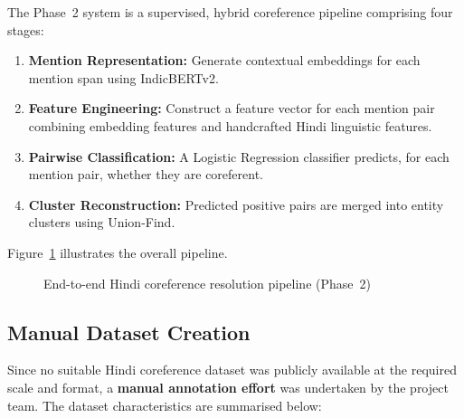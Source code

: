 \documentclass[12pt,a4paper]{report}
\begin{document}
The Phase~2 system is a supervised, hybrid coreference pipeline comprising four stages:

\begin{enumerate}
    \item \textbf{Mention Representation:} Generate contextual embeddings for each mention span using IndicBERTv2.
    \item \textbf{Feature Engineering:} Construct a feature vector for each mention pair combining embedding features and handcrafted Hindi linguistic features.
    \item \textbf{Pairwise Classification:} A Logistic Regression classifier predicts, for each mention pair, whether they are coreferent.
    \item \textbf{Cluster Reconstruction:} Predicted positive pairs are merged into entity clusters using Union-Find.
\end{enumerate}

Figure~\ref{fig:system_arch} illustrates the overall pipeline.

\begin{figure}[H]
\centering
{}
\caption{End-to-end Hindi coreference resolution pipeline (Phase~2)}
\label{fig:system_arch}
\end{figure}

\subsection{Manual Dataset Creation}

Since no suitable Hindi coreference dataset was publicly available at the required scale and format, a \textbf{manual annotation effort} was undertaken by the project team. The dataset characteristics are summarised below:
\end{document}
